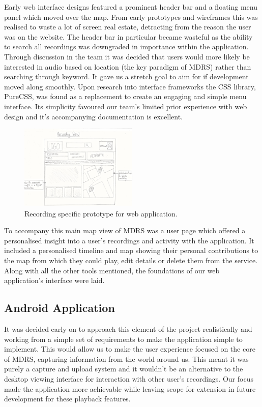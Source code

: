 \documentclass{l3proj}
\begin{document}
Early web interface designs featured a prominent header bar and a floating menu panel which moved over the map. From early prototypes and wireframes this was realised to waste a lot of screen real estate, detracting from the reason the user was on the website. The header bar in particular became wasteful as the ability to search all recordings was downgraded in importance within the application. Through discussion in the team it was decided that users would more likely be interested in audio based on location (the key paradigm of MDRS) rather than searching through keyword. It gave us a stretch goal to aim for if development moved along smoothly. Upon research into interface frameworks the CSS library, PureCSS, was found as a replacement to create an engaging and simple menu interface. Its simplicity favoured our team's limited prior experience with web design and it’s accompanying documentation is excellent.

\begin{figure}[ht!]
\centering
\includegraphics[width=0.5\textwidth]{images/web-recording-view.jpg}
\caption{Recording specific prototype for web application.}
\end{figure}

To accompany this main map view of MDRS was a user page which offered a
personalised insight into a user's recordings and activity with the application.
It included a personalised timeline and map showing their personal contributions
to the map from which they could play, edit details or delete them from the
service. Along with all the other tools mentioned, the foundations of our
web application's interface were laid.

\subsection{Android Application} It was decided early on to approach this
element of the project realistically and working from a simple set of requirements to
make the application simple to implement. This would allow us to make the user experience focused on the core of MDRS, capturing information from the world around us. This meant it was purely a capture and upload system and it wouldn't be an alternative to the desktop viewing interface for interaction with other user's recordings. Our focus made the application more achievable while leaving scope for extension in future development for these playback features.
\end{document}
